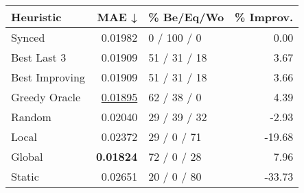 \begin{tabular}{lrlr}
\toprule
\textbf{Heuristic} & \textbf{MAE ↓} & \textbf{\% Be/Eq/Wo} & \textbf{\% Improv.} \\
\midrule
            Synced &        0.01982 &          0 / 100 / 0 &                0.00 \\
\midrule
       Best Last 3 &        0.01909 &         51 / 31 / 18 &                3.67 \\
    Best Improving &        0.01909 &         51 / 31 / 18 &                3.66 \\
\addlinespace
     Greedy Oracle &        \underline{0.01895} &          62 / 38 / 0 &                4.39 \\
            Random &        0.02040 &         29 / 39 / 32 &               -2.93 \\
\midrule
             Local &        0.02372 &          29 / 0 / 71 &              -19.68 \\
            Global &        \textbf{0.01824} &          72 / 0 / 28 &                7.96 \\
\midrule
            Static &        0.02651 &          20 / 0 / 80 &              -33.73 \\
\bottomrule
\end{tabular}

\label{tab:iid_lr05_le2_bs2_Summary}
